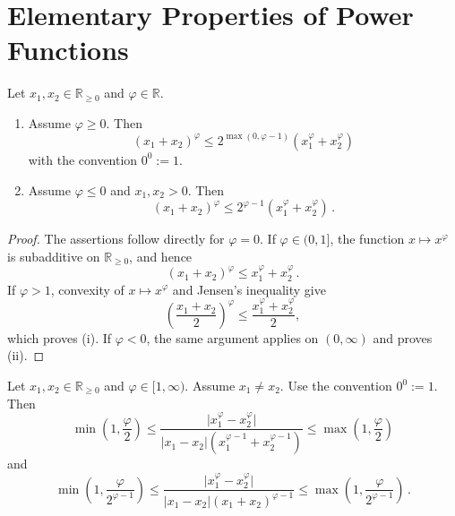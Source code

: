 \documentclass{article}
\newcommand{\R}{\mathbb{R}}
\newcommand{\Rp}{\R_{\geq0}}
\newcommand{\lb}{\left(} %
\newcommand{\rb}{\right)} %
\newcommand{\br}[1]{\lb #1 \rb} %
\newcommand{\brOf}[1]{\!\br{#1}} %
\newcommand{\absof}[1]{\vert #1 \vert} %
\newcommand{\eqfs}{\,.}
\begin{document}
\section{Elementary Properties of Power Functions}\label{sec:powfun}
%
\begin{lemma}\label{lmm:power:subadd}
    Let $x_1, x_2 \in\Rp$ and $\varphi\in\R$. 
    \begin{enumerate}[label=(\roman*)]
        \item Assume $\varphi \geq 0$. 
        Then
        \begin{equation}
            (x_1 + x_2)^\varphi \leq 2^{\max(0, \varphi-1)}(x_1^\varphi + x_2^\varphi)
        \end{equation}
        with the convention $0^0:=1$.
        \item Assume $\varphi \leq 0$ and $x_1, x_2 >0$.
        Then
        \begin{equation}
            (x_1 + x_2)^\varphi \leq 2^{\varphi-1}(x_1^\varphi + x_2^\varphi)
            \eqfs
        \end{equation}
    \end{enumerate}
\end{lemma}
%
\begin{proof}
    The assertions follow directly for $\varphi=0$. If
    $\varphi\in(0,1]$, the function $x\mapsto x^\varphi$ is
    subadditive on $\Rp$, and hence
    \begin{equation}
        (x_1+x_2)^\varphi
        \leq
        x_1^\varphi+x_2^\varphi
        \eqfs
    \end{equation}
    If $\varphi>1$, convexity of $x\mapsto x^\varphi$ and Jensen's
    inequality give
    \begin{equation}
        \br{\frac{x_1+x_2}{2}}^\varphi
        \leq
        \frac{x_1^\varphi+x_2^\varphi}{2},
    \end{equation}
    which proves \textup{(i)}. If $\varphi<0$, the same argument applies
    on $(0,\infty)$ and proves \textup{(ii)}.
\end{proof}
%
\begin{lemma}\label{lmm:power:ana:diff}
    Let $x_1, x_2 \in\Rp$ and $\varphi\in[1, \infty)$. Assume $x_1 \neq x_2$.
    Use the convention $0^0:=1$.
    Then
    \begin{equation}
        \min\brOf{1, \frac\varphi2}
        \leq \frac{\absof{x_1^\varphi - x_2^\varphi}}{\absof{x_1 - x_2}\br{x_1^{\varphi-1} + x_2^{\varphi-1}}} \leq 
        \max\brOf{1, \frac\varphi2}
    \end{equation}
    and
    \begin{equation}
        \min\brOf{1, \frac\varphi{2^{\varphi-1}}}
        \leq \frac{\absof{x_1^\varphi - x_2^\varphi}}{\absof{x_1 - x_2}\br{x_1 + x_2}^{\varphi-1}} \leq 
        \max\brOf{1, \frac\varphi{2^{\varphi-1}}}
        \eqfs
    \end{equation}
\end{lemma}
\end{document}
